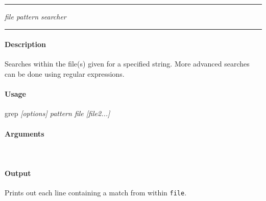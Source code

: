 \hrule
\vspace{1mm}
%
    
    {\emph{file pattern searcher}}{}
\hrule
\vspace{4mm}

\paragraph{Description}
\indentpar \raggedright \textrm{Searches within the file(s) given for a specified string. More advanced searches can be done using regular expressions.}\\

\paragraph{Usage}
\indentpar grep \textit{[options] pattern file [file2...]}

\paragraph{Arguments}
\indentpar {}\\
\indentpar {}

\paragraph{Output}
\indentpar \textrm{Prints out each line containing a match from within \texttt{file}.}

